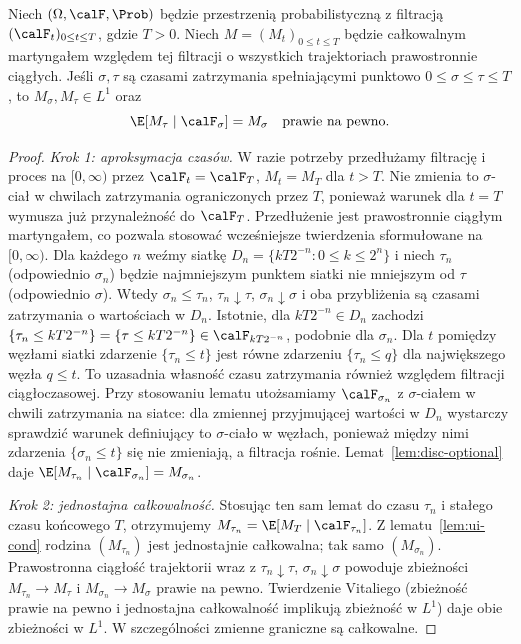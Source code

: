 \begin{twierdzenie}
\label{thm:optional-cont}
Niech $(\Omega,\calF,\Prob)$ będzie przestrzenią
probabilistyczną z filtracją $(\calF_t)_{0\le t\le T}$,
gdzie $T>0$. Niech $M=(M_t)_{0\le t\le T}$
będzie całkowalnym martyngałem względem tej filtracji
o wszystkich trajektoriach prawostronnie ciągłych.
Jeśli $\sigma,\tau$ są czasami zatrzymania spełniającymi
punktowo $0\le\sigma\le\tau\le T$,
to $M_\sigma,M_\tau\in L^1$ oraz
\[
\E[M_\tau\mid\calF_\sigma]=M_\sigma
\quad\text{prawie na pewno}.
\]
\end{twierdzenie}
\begin{proof}
\emph{Krok 1: aproksymacja czasów.}
W razie potrzeby przedłużamy filtrację i proces na
$[0,\infty)$ przez $\calF_t=\calF_T$, $M_t=M_T$ dla
$t>T$. Nie zmienia to $\sigma$-ciał w chwilach
zatrzymania ograniczonych przez $T$, ponieważ
warunek dla $t=T$ wymusza już przynależność do
$\calF_T$. Przedłużenie jest prawostronnie ciągłym
martyngałem, co pozwala stosować wcześniejsze twierdzenia
sformułowane na $[0,\infty)$.
Dla każdego $n$ weźmy siatkę $D_n=\{kT2^{-n}:0\le k\le2^n\}$
i niech $\tau_n$ (odpowiednio $\sigma_n$) będzie
najmniejszym punktem siatki nie mniejszym od $\tau$
(odpowiednio $\sigma$). Wtedy
$\sigma_n\le\tau_n$, $\tau_n\downarrow\tau$,
$\sigma_n\downarrow\sigma$ i oba przybliżenia są
czasami zatrzymania o wartościach w $D_n$.
Istotnie, dla $kT2^{-n}\in D_n$ zachodzi
$\{\tau_n\le kT2^{-n}\}=\{\tau\le kT2^{-n}\}\in\calF_{kT2^{-n}}$,
podobnie dla $\sigma_n$. Dla $t$ pomiędzy węzłami
siatki zdarzenie $\{\tau_n\le t\}$ jest równe zdarzeniu
$\{\tau_n\le q\}$ dla największego węzła $q\le t$.
To uzasadnia własność czasu zatrzymania również
względem filtracji ciągłoczasowej.
Przy stosowaniu lematu utożsamiamy $\calF_{\sigma_n}$
z $\sigma$-ciałem w chwili zatrzymania na siatce:
dla zmiennej przyjmującej wartości w $D_n$ wystarczy
sprawdzić warunek definiujący to $\sigma$-ciało
w węzłach, ponieważ między nimi zdarzenia
$\{\sigma_n\le t\}$ się nie zmieniają, a filtracja rośnie.
Lemat~\ref{lem:disc-optional} daje
$\E[M_{\tau_n}\mid\calF_{\sigma_n}]=M_{\sigma_n}$.

\emph{Krok 2: jednostajna całkowalność.}
Stosując ten sam lemat do czasu $\tau_n$ i
stałego czasu końcowego $T$, otrzymujemy
$M_{\tau_n}=\E[M_T\mid\calF_{\tau_n}]$.
Z lematu~\ref{lem:ui-cond} rodzina
$(M_{\tau_n})$ jest jednostajnie całkowalna;
tak samo $(M_{\sigma_n})$.
Prawostronna ciągłość trajektorii wraz z
$\tau_n\downarrow\tau$, $\sigma_n\downarrow\sigma$
powoduje zbieżności
$M_{\tau_n}\to M_\tau$ i
$M_{\sigma_n}\to M_\sigma$ prawie na pewno.
Twierdzenie Vitaliego (zbieżność prawie na pewno i
jednostajna całkowalność implikują zbieżność w $L^1$)
daje obie zbieżności w $L^1$. W szczególności
zmienne graniczne są całkowalne.


\end{proof}
